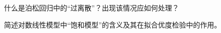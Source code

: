 \par\addvspace{8pt}\noindent\begin{minipage}{\linewidth}


什么是泊松回归中的``过离散''？出现该情况应如何处理？



\end{minipage}\par\vspace{5pt}

\par\addvspace{8pt}\noindent\begin{minipage}{\linewidth}


简述对数线性模型中``饱和模型''的含义及其在拟合优度检验中的作用。



\end{minipage}\par\vspace{5pt}

